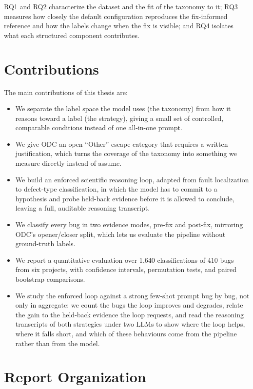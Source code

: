 \documentclass{iutbscthesis}
\begin{document}
RQ1 and RQ2 characterize the dataset and the fit of the taxonomy to it; RQ3 measures how closely the default configuration reproduces the fix-informed reference and how the labels change when the fix is visible; and RQ4 isolates what each structured component contributes.

\section{Contributions}

The main contributions of this thesis are:

\begin{itemize}
    \item We separate the label space the model uses (the taxonomy) from how it reasons toward a label (the strategy), giving a small set of controlled, comparable conditions instead of one all-in-one prompt.
    \item We give ODC an open ``Other'' escape category that requires a written justification, which turns the coverage of the taxonomy into something we measure directly instead of assume.
    \item We build an enforced scientific reasoning loop, adapted from fault localization to defect-type classification, in which the model has to commit to a hypothesis and probe held-back evidence before it is allowed to conclude, leaving a full, auditable reasoning transcript.
    \item We classify every bug in two evidence modes, pre-fix and post-fix, mirroring ODC's opener/closer split, which lets us evaluate the pipeline without ground-truth labels.
    \item We report a quantitative evaluation over 1{,}640 classifications of 410 bugs from six projects, with confidence intervals, permutation tests, and paired bootstrap comparisons.
    \item We study the enforced loop against a strong few-shot prompt bug by bug, not only in aggregate: we count the bugs the loop improves and degrades, relate the gain to the held-back evidence the loop requests, and read the reasoning transcripts of both strategies under two LLMs to show where the loop helps, where it falls short, and which of these behaviours come from the pipeline rather than from the model.
\end{itemize}

\section{Report Organization}
\end{document}
